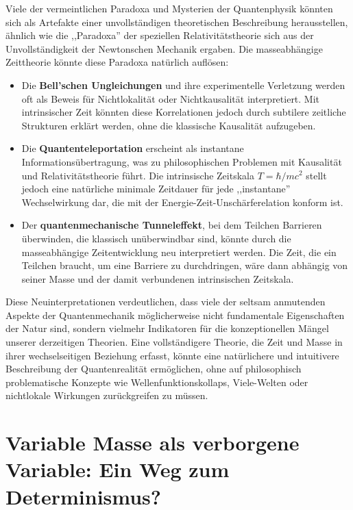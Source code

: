 \documentclass[12pt,a4paper]{article}  %
\begin{document}
	Viele der vermeintlichen Paradoxa und Mysterien der Quantenphysik könnten sich als Artefakte einer unvollständigen theoretischen Beschreibung herausstellen, ähnlich wie die ,,Paradoxa'' der speziellen Relativitätstheorie sich aus der Unvollständigkeit der Newtonschen Mechanik ergaben. Die masseabhängige Zeittheorie könnte diese Paradoxa natürlich auflösen:
	
	\begin{itemize}
		\item Die \textbf{Bell'schen Ungleichungen} und ihre experimentelle Verletzung werden oft als Beweis für Nichtlokalität oder Nichtkausalität interpretiert. Mit intrinsischer Zeit könnten diese Korrelationen jedoch durch subtilere zeitliche Strukturen erklärt werden, ohne die klassische Kausalität aufzugeben.
		
		\item Die \textbf{Quantenteleportation} erscheint als instantane Informationsübertragung, was zu philosophischen Problemen mit Kausalität und Relativitätstheorie führt. Die intrinsische Zeitskala $T = \hbar/mc^2$ stellt jedoch eine natürliche minimale Zeitdauer für jede ,,instantane'' Wechselwirkung dar, die mit der Energie-Zeit-Unschärferelation konform ist.
		
		\item Der \textbf{quantenmechanische Tunneleffekt}, bei dem Teilchen Barrieren überwinden, die klassisch unüberwindbar sind, könnte durch die masseabhängige Zeitentwicklung neu interpretiert werden. Die Zeit, die ein Teilchen braucht, um eine Barriere zu durchdringen, wäre dann abhängig von seiner Masse und der damit verbundenen intrinsischen Zeitskala.
	\end{itemize}
	
	Diese Neuinterpretationen verdeutlichen, dass viele der seltsam anmutenden Aspekte der Quantenmechanik möglicherweise nicht fundamentale Eigenschaften der Natur sind, sondern vielmehr Indikatoren für die konzeptionellen Mängel unserer derzeitigen Theorien. Eine vollständigere Theorie, die Zeit und Masse in ihrer wechselseitigen Beziehung erfasst, könnte eine natürlichere und intuitivere Beschreibung der Quantenrealität ermöglichen, ohne auf philosophisch problematische Konzepte wie Wellenfunktionskollaps, Viele-Welten oder nichtlokale Wirkungen zurückgreifen zu müssen.
	
	\section{Variable Masse als verborgene Variable: Ein Weg zum Determinismus?}
	
\end{document}
